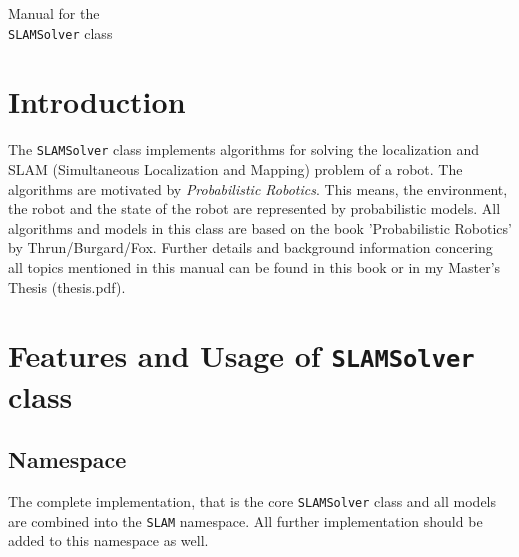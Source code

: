 \documentclass{article}
\newcommand{\SLAM}{\texttt{SLAMSolver} class }
\begin{document}
\begin{framed}
\centering
      \Huge{Manual for the \\ \SLAM}
 \end{framed}
\tableofcontents
\newpage
\section{Introduction}
The \SLAM implements algorithms for solving the localization and SLAM (Simultaneous Localization and Mapping) problem of a robot. The algorithms are motivated by \textit{Probabilistic Robotics}. This means, the environment, the robot and the state of the robot are represented by probabilistic models. All algorithms and models in this class are based on the book 'Probabilistic Robotics' by Thrun/Burgard/Fox. Further details and background information concering all topics mentioned in this manual can be found in this book or in my Master's Thesis (thesis.pdf). 
\section{Features and Usage of \SLAM}
\subsection{Namespace}
The complete implementation, that is the core \SLAM and all models are combined into the \texttt{SLAM} namespace. All further implementation should be added to this namespace as well.
\end{document}
